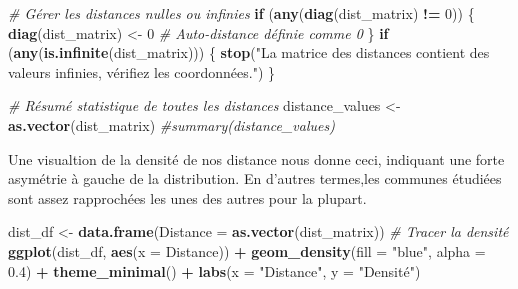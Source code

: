 \documentclass[
]{article}
\newenvironment{Shaded}{\begin{snugshade}}{\end{snugshade}}
\newcommand{\AttributeTok}[1]{\textcolor[rgb]{0.13,0.29,0.53}{#1}}
\newcommand{\CommentTok}[1]{\textcolor[rgb]{0.56,0.35,0.01}{\textit{#1}}}
\newcommand{\ControlFlowTok}[1]{\textcolor[rgb]{0.13,0.29,0.53}{\textbf{#1}}}
\newcommand{\DecValTok}[1]{\textcolor[rgb]{0.00,0.00,0.81}{#1}}
\newcommand{\FloatTok}[1]{\textcolor[rgb]{0.00,0.00,0.81}{#1}}
\newcommand{\FunctionTok}[1]{\textcolor[rgb]{0.13,0.29,0.53}{\textbf{#1}}}
\newcommand{\NormalTok}[1]{#1}
\newcommand{\OtherTok}[1]{\textcolor[rgb]{0.56,0.35,0.01}{#1}}
\newcommand{\SpecialCharTok}[1]{\textcolor[rgb]{0.81,0.36,0.00}{\textbf{#1}}}
\newcommand{\StringTok}[1]{\textcolor[rgb]{0.31,0.60,0.02}{#1}}
\begin{document}
\begin{Shaded}
\begin{Highlighting}[]
\CommentTok{\# Gérer les distances nulles ou infinies}
\ControlFlowTok{if}\NormalTok{ (}\FunctionTok{any}\NormalTok{(}\FunctionTok{diag}\NormalTok{(dist\_matrix) }\SpecialCharTok{!=} \DecValTok{0}\NormalTok{)) \{}
  \FunctionTok{diag}\NormalTok{(dist\_matrix) }\OtherTok{\textless{}{-}} \DecValTok{0}  \CommentTok{\# Auto{-}distance définie comme 0}
\NormalTok{\}}
\ControlFlowTok{if}\NormalTok{ (}\FunctionTok{any}\NormalTok{(}\FunctionTok{is.infinite}\NormalTok{(dist\_matrix))) \{}
  \FunctionTok{stop}\NormalTok{(}\StringTok{"La matrice des distances contient des valeurs infinies, vérifiez les coordonnées."}\NormalTok{)}
\NormalTok{\}}

\CommentTok{\# Résumé statistique de toutes les distances}
\NormalTok{distance\_values }\OtherTok{\textless{}{-}} \FunctionTok{as.vector}\NormalTok{(dist\_matrix)}
\CommentTok{\#summary(distance\_values)}
\end{Highlighting}
\end{Shaded}

Une visualtion de la densité de nos distance nous donne ceci, indiquant
une forte asymétrie à gauche de la distribution. En d'autres termes,les
communes étudiées sont assez rapprochées les unes des autres pour la
plupart.

\begin{Shaded}
\begin{Highlighting}[]
\NormalTok{dist\_df }\OtherTok{\textless{}{-}} \FunctionTok{data.frame}\NormalTok{(}\AttributeTok{Distance =} \FunctionTok{as.vector}\NormalTok{(dist\_matrix))}
\CommentTok{\# Tracer la densité}
\FunctionTok{ggplot}\NormalTok{(dist\_df, }\FunctionTok{aes}\NormalTok{(}\AttributeTok{x =}\NormalTok{ Distance)) }\SpecialCharTok{+}
  \FunctionTok{geom\_density}\NormalTok{(}\AttributeTok{fill =} \StringTok{"blue"}\NormalTok{, }\AttributeTok{alpha =} \FloatTok{0.4}\NormalTok{) }\SpecialCharTok{+}
  \FunctionTok{theme\_minimal}\NormalTok{() }\SpecialCharTok{+}
  \FunctionTok{labs}\NormalTok{(}\AttributeTok{x =} \StringTok{"Distance"}\NormalTok{, }\AttributeTok{y =} \StringTok{"Densité"}\NormalTok{)}
\end{Highlighting}
\end{Shaded}
\end{document}

